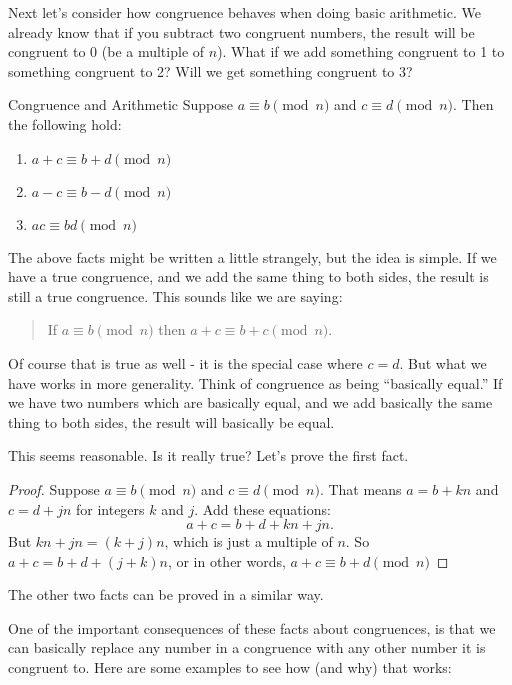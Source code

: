 \documentclass[12pt]{article}
\begin{document}
Next let's consider how congruence behaves when doing basic arithmetic.  We already know that if you subtract two congruent numbers, the result will be congruent to 0 (be a multiple of $n$).  What if we add something congruent to 1 to something congruent to 2?  Will we get something congruent to 3?  

\begin{defbox}{Congruence and Arithmetic}
	Suppose $a \equiv b \pmod{n}$ and $c \equiv d \pmod{n}$.  Then the following hold:
	\begin{enumerate}
		\item $a+c \equiv b+d \pmod{n}$
		\item $a-c \equiv b-d \pmod{n}$
		\item $ac \equiv bd \pmod{n}$	
	\end{enumerate}
\end{defbox}

The above facts might be written a little strangely, but the idea is simple.  If we have a true congruence, and we add the same thing to both sides, the result is still a true congruence.  This sounds like we are saying:
\begin{quote}
If $a \equiv b \pmod{n}$ then $a+c \equiv b+c \pmod{n}$.
\end{quote}

Of course that is true as well - it is the special case where $c = d$.  But what we have works in more generality.  Think of congruence as being ``basically equal.''  If we have two numbers which are basically equal, and we add basically the same thing to both sides, the result will basically be equal.

This seems reasonable.  Is it really true?  Let's prove the first fact.

\begin{proof}
	Suppose $a \equiv b \pmod{n}$ and $c \equiv d \pmod{n}$.  That means $a = b + kn$ and $c = d + jn$ for integers $k$ and $j$.  Add these equations: \[a+c = b+d + kn + jn.\]  But $kn + jn = (k+j)n$, which is just a multiple of $n$.  So $a+c = b+d + (j+k)n$, or in other words, $a+c \equiv b+d \pmod{n}$
\end{proof}

The other two facts can be proved in a similar way.  

One of the important consequences of these facts about congruences, is that we can basically replace any number in a congruence with any other number it is congruent to.  Here are some examples to see how (and why) that works:
\end{document}

